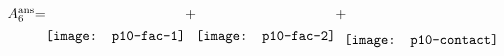 \documentclass{standalone}
\begin{document}
$
	A_6^{\text{ans}}{=}\raisebox{-5.5mm}{\texttt{[image: p10-fac-1]}}{+}\raisebox{-5.5mm}{\texttt{[image: p10-fac-2]}}{+}\hspace*{-0.05cm}\raisebox{-6.5mm}{\texttt{[image: p10-contact]}}\label{Op10an}
$
\end{document}
